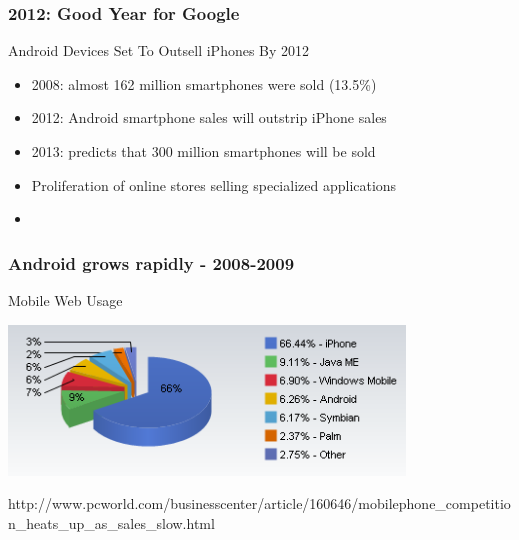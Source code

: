 \documentclass{beamer}
\begin{document}
\begin{frame}
\frametitle{2012: Good Year for Google}

\begin{center}
\begin{large}
 Android Devices Set To Outsell iPhones By 2012
\end{large}
\end{center}

\begin{itemize}
\item 2008: almost 162 million smartphones were sold (13.5\%)
\item 2012: Android smartphone sales will outstrip iPhone sales
\item 2013: predicts that 300 million smartphones will be sold
\item Proliferation of online stores selling specialized applications
\item {}
\end{itemize} 

\end{frame}

\begin{frame}
\frametitle{Android grows rapidly - 2008-2009}

\begin{center}
\begin{large}
 Mobile Web Usage
\end{large}

\hspace{0.2cm}

\includegraphics[height=4.0cm]{figs/mobile_web_usage}

\hspace{0.2cm}

                  {http://www.pcworld.com/businesscenter/article/160646/mobilephone_competition_heats_up_as_sales_slow.html}

\end{center}

\end{frame}
\end{document}
